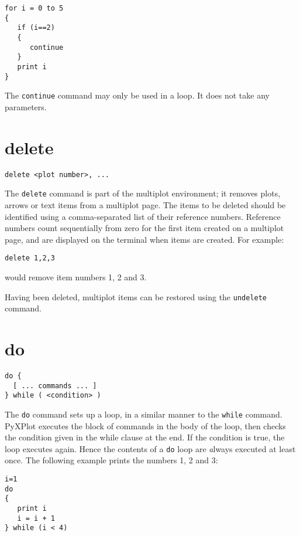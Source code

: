 \begin{verbatim}
for i = 0 to 5
{
   if (i==2)
   {
      continue
   }
   print i
}
\end{verbatim}

The {\tt continue} command may only be used in a loop.  It does not take any
parameters.

\section{delete}

\begin{verbatim}
delete <plot number>, ...
\end{verbatim}

The {\tt delete} command is part of the multiplot environment; it removes
plots, arrows or text items from a multiplot page. The items to be deleted should be
identified using a comma-separated list of their reference numbers.  Reference
numbers count sequentially from zero for the first item created on a multiplot
page, and are displayed on the terminal when items are created.  For example:

\begin{verbatim}
delete 1,2,3
\end{verbatim}

\noindent would remove item numbers 1, 2 and 3.

Having been deleted, multiplot items can be restored using the {\tt undelete}
command.

\section{do}

\begin{verbatim}
do {
  [ ... commands ... ]
} while ( <condition> )
\end{verbatim}

The {\tt do} command sets up a loop, in a similar manner to the {\tt while}
command.  PyXPlot executes the block of commands in the body of the loop, then
checks the condition given in the while clause at the end.  If the condition is
true, the loop executes again.  Hence the contents of a {\tt do} loop are {\emph
always} executed at least once.  The following example prints the numbers 1, 2
and 3:

\begin{verbatim}
i=1
do
{
   print i
   i = i + 1
} while (i < 4)
\end{verbatim}

